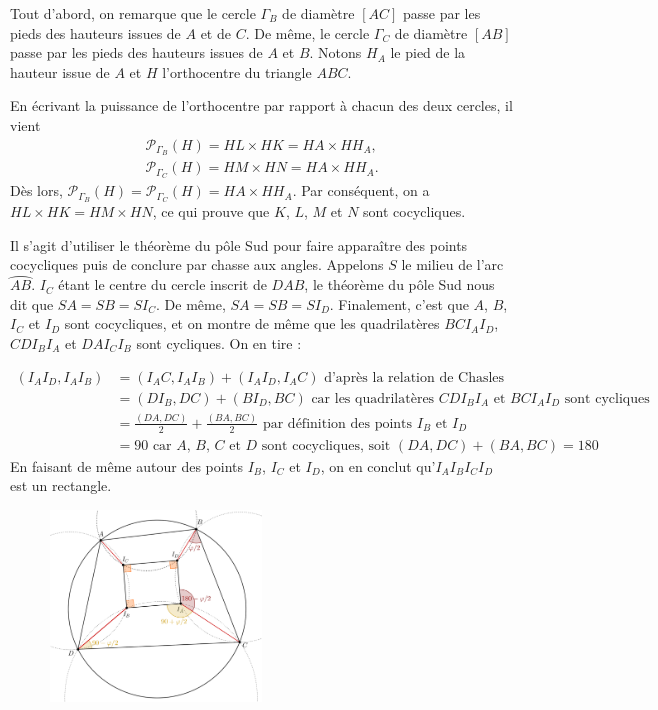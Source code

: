 \begin{sol}
Tout d'abord, on remarque que le cercle $\Gamma_B$ de diamètre $[AC]$ passe par les pieds des hauteurs issues de $A$ et de $C$. De même, le cercle $\Gamma_C$ de diamètre $[AB]$ passe par les pieds des hauteurs issues de $A$ et $B$. Notons $H_A$ le pied de la hauteur issue de $A$ et $H$ l'orthocentre du triangle $ABC$.

En écrivant la puissance de l'orthocentre par rapport à chacun des deux cercles, il vient
\begin{gather*}
    \mathcal{P}_{\Gamma_B}(H) = HL \times HK = HA \times HH_A, \\
    \mathcal{P}_{\Gamma_C}(H) = HM \times HN = HA \times HH_A.
\end{gather*}
Dès lors, $\mathcal{P}_{\Gamma_B}(H) = \mathcal{P}_{\Gamma_C}(H) = HA \times HH_A$. Par conséquent, on a $HL \times HK = HM \times HN$, ce qui prouve que $K$, $L$, $M$ et $N$ sont cocycliques.
\end{sol}


\begin{sol}
Il s'agit d'utiliser le théorème du pôle Sud pour faire apparaître des points cocycliques puis de conclure par chasse aux angles. Appelons $S$ le milieu de l'arc $\wideparen{AB}$. $I_C$ étant le centre du cercle inscrit de $DAB$, le théorème du pôle Sud nous dit que $SA=SB=SI_C$. De même, $SA=SB=SI_D$. Finalement, c'est que $A$, $B$, $I_C$ et $I_D$ sont cocycliques, et on montre de même que les quadrilatères $BCI_AI_D$, $CDI_BI_A$ et $DAI_CI_B$ sont cycliques. On en tire :

\begin{align*}
(I_AI_D,I_AI_B) &= (I_AC,I_AI_B)+(I_AI_D,I_AC) \text{\ \ d'après la relation de Chasles}\\
&= (DI_B,DC)+(BI_D,BC) \text{\ \ car les quadrilatères $CDI_BI_A$ et $BCI_AI_D$ sont cycliques}\\
&= \frac{(DA,DC)}{2}+\frac{(BA,BC)}{2} \text{\ \ par définition des points $I_B$ et $I_D$}\\
&= 90 \text{\ \ car $A$, $B$, $C$ et $D$ sont cocycliques, soit $(DA,DC)+(BA,BC)=180$}
\end{align*}
En faisant de même autour des points $I_B$, $I_C$ et $I_D$, on en conclut qu'$I_AI_BI_CI_D$ est un rectangle.

\begin{figure}[!h]
\centerline{\includegraphics[width=0.5\textwidth]{rectangle_X}}
\end{figure}
\end{sol}


